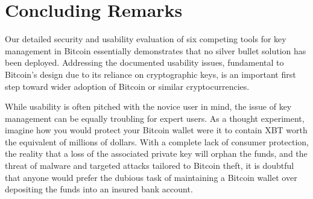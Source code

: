 
\section{Concluding Remarks}

Our detailed security and usability evaluation of six competing tools for key management in Bitcoin essentially demonstrates that no silver bullet solution has been deployed. Addressing the documented usability issues, fundamental to Bitcoin's design due to its reliance on cryptographic keys, is an important first step toward wider adoption of Bitcoin or similar cryptocurrencies. 

While usability is often pitched with the novice user in mind, the issue of key management can be equally troubling for expert users. As a thought experiment, imagine how you would protect your Bitcoin wallet were it to contain XBT worth the equivalent of millions of dollars. With a complete lack of consumer protection, the reality that a loss of the associated private key will orphan the funds, and the threat of malware and targeted attacks tailored to Bitcoin theft, it is doubtful that anyone would prefer the dubious task of maintaining a Bitcoin wallet over depositing the funds into an insured bank account. 

